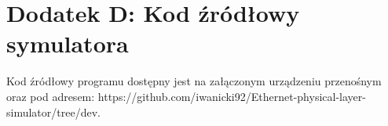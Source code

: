 \setcounter{secnumdepth}{0}
\section*{Dodatek D: Kod źródłowy symulatora}

Kod źródłowy programu dostępny jest na załączonym urządzeniu przenośnym oraz pod adresem: https://github.com/iwanicki92/Ethernet-physical-layer-simulator/tree/dev.
